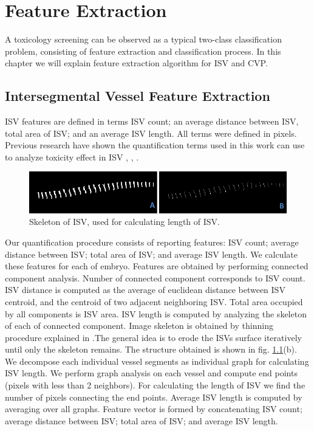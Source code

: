 \chapter{Feature Extraction}\label{chap:feature}
A toxicology screening can be observed as a typical two-class classification problem, consisting of feature extraction and classification process. In this chapter we will explain feature extraction algorithm for ISV and CVP.

\section{Intersegmental Vessel Feature Extraction}
ISV features are defined in terms ISV count; an average distance between ISV, total area of ISV; and an average ISV length. All terms were defined in pixels. Previous research have shown the quantification terms used in this work can use to analyze toxicity effect in ISV \cite{Feng05}, \cite{Tran07}, \cite{Vogt09}.

\begin{figure}[H]
  \begin{center}
    \includegraphics[scale=0.7]{figure/skeleton.png}
  \end{center}
  \caption[ISV skeleton]{Skeleton of ISV, used for calculating length of ISV.} 
  \label{skeleton}
\end{figure}

Our quantification procedure consists of reporting features: ISV count; average distance between ISV; total area of ISV; and average ISV length. We calculate these features for each of embryo. Features are obtained by performing connected component analysis. Number of connected component corresponds to ISV count. ISV distance is computed as the average of euclidean distance between ISV centroid, and the centroid of two adjacent neighboring ISV. Total area occupied by all components is ISV area. ISV length is computed by analyzing the skeleton of each of connected component. Image skeleton is obtained by thinning procedure explained in \cite{Lee94}.The general idea is to erode the ISVs surface iteratively until only the skeleton remains. The structure obtained is shown in fig. \ref{skeleton}(b). We decompose each individual vessel segments as individual graph for calculating ISV length. We perform graph analysis on each vessel and compute end points (pixels with less than 2 neighbors). For calculating the length of ISV we find the number of pixels connecting the end points. Average ISV length is computed by averaging over all graphs. Feature vector is formed by concatenating ISV count; average distance between ISV; total area of ISV; and average ISV length. 

